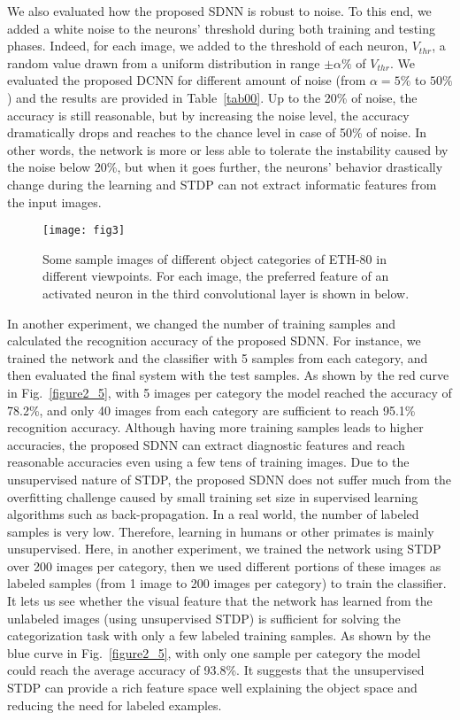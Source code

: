 \documentclass[preprint,5p,12pt,twocolumn]{article}
\begin{document}
We also evaluated how the proposed SDNN is robust to noise.  To this end, we added a white noise to the neurons' threshold during both training and testing phases. Indeed, for each image, we added to the threshold of each neuron, $V_{thr}$, a random value drawn from a uniform distribution in range $\pm \alpha\%$ of $V_{thr}$. We evaluated the proposed DCNN for different amount of noise (from  $\alpha=5\%$ to $50\%$) and the results are provided in Table~\ref{tab00}. Up to the 20\% of noise, the accuracy is still reasonable, but by increasing the noise level, the accuracy dramatically drops and reaches to the chance level in case of 50\% of noise. In other words, the network is more or less able to tolerate the instability caused by the noise below 20\%, but when it goes further, the neurons' behavior drastically change during the learning  and STDP can not extract informatic features from the input images.




\begin{figure*}[!tb]
\centering
\texttt{[image: fig3]}
\caption{ Some sample images of different object categories of ETH-80 in different viewpoints. For each image, the preferred feature of an activated neuron in the third convolutional layer is shown in below.}
\label{figure3}
\end{figure*}

In another experiment, we changed the number of training samples and calculated the recognition accuracy of the proposed SDNN. For instance, we trained the network and the classifier with 5 samples from each category, and then evaluated the final system with the test samples. As shown by the red curve in Fig.~\ref{figure2_5}, with 5 images per category the model reached the accuracy of 78.2\%, and only 40 images from each category are sufficient to reach 95.1\% recognition accuracy. Although having more training samples leads to higher accuracies, the proposed SDNN can extract diagnostic features and reach reasonable accuracies even using a few tens of training images.  Due to the unsupervised nature of STDP, the proposed SDNN does not suffer much from the overfitting challenge caused by small training set size in supervised learning algorithms such as back-propagation. In a real world, the number of labeled samples is very low. Therefore, learning in humans or other primates is mainly unsupervised. Here, in another experiment, we trained the network using STDP over 200 images per category, then we used different portions of these images as labeled samples (from 1 image to 200 images per category) to train the classifier. It lets us see whether the visual feature that the network has learned from the unlabeled images (using unsupervised STDP)  is sufficient for solving the categorization task with only a few labeled training samples. As shown by the blue curve in Fig.~\ref{figure2_5}, with only one sample per category the model could reach the average accuracy of 93.8\%. It suggests that the unsupervised STDP can provide a rich feature space well explaining the object space and reducing the need for labeled examples.
\end{document}
